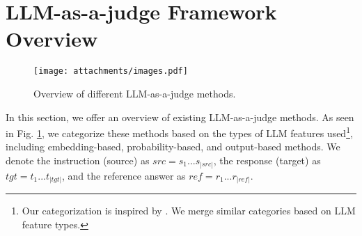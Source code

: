 \section{\label{overview}LLM-as-a-judge Framework Overview}
\begin{figure}
    \centering
    \texttt{[image: attachments/images.pdf]}
    \vspace{-2.0em}
    \caption{Overview of different LLM-as-a-judge methods.}
    \label{fig:approach}
\vspace{-1.0em}
\end{figure}

In this section, we offer an overview of existing LLM-as-a-judge methods. As seen in Fig. \ref{fig:approach}, we categorize these methods based on the types of LLM features used\footnote{Our categorization is inspired by \cite{DBLP:journals/corr/abs-2402-01383}. We merge similar categories based on LLM feature types.}, including embedding-based, probability-based, and output-based methods. We denote the instruction (source) as \(src=s_1...s_{|src|}\), the response (target) as \(tgt=t_1...t_{|tgt|}\), and the reference answer as \(ref=r_1...r_{|ref|}\).
